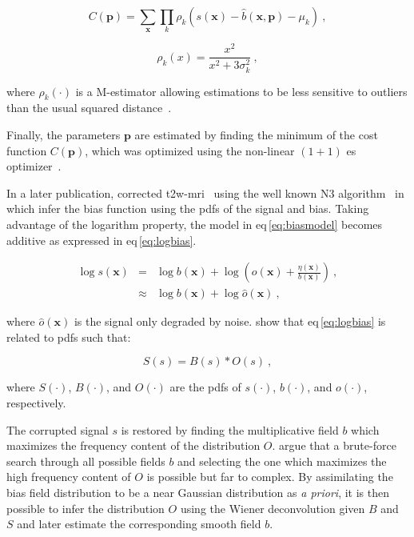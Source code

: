 \begin{equation}
	C(\mathbf{p}) = \sum_{\mathbf{x}} \prod_{k} \rho_k(s(\mathbf{x}) - \hat{b}(\mathbf{x},\mathbf{p}) - \mu_k) \ ,
	\label{eq:costbias}
\end{equation}

\begin{equation}
	\rho_k(x) = \frac{x^2}{x^2 + 3 \sigma_k^2} \ ,
	\label{eq:mestbias}
\end{equation}

\noindent where $\rho_k(\cdot)$ is a M-estimator allowing estimations to be less sensitive to outliers than the usual squared distance~\cite{Li1996}.

Finally, the parameters $\mathbf{p}$ are estimated by finding the minimum of the cost function $C(\mathbf{p})$, which was optimized using the non-linear $(1+1)$ \ac{es} optimizer~\cite{Styner1997}.

In a later publication, \citeauthor{Viswanath2012} corrected \ac{t2w}-\ac{mri}~\cite{Viswanath2012} using the well known N3 algorithm~\cite{Sled1998} in which \citeauthor{Sled1998} infer the bias function using the \acp{pdf} of the signal and bias.
Taking advantage of the logarithm property, the model in \acs{eq}\,\eqref{eq:biasmodel} becomes additive as expressed in \acs{eq}\,\eqref{eq:logbias}.

\begin{eqnarray}
	\log s(\mathbf{x}) & = & \log b(\mathbf{x}) + \log \left( o(\mathbf{x}) + \frac{\eta(\mathbf{x})}{b(\mathbf{x})} \right) \ , \nonumber \\
	& \approx & \log b(\mathbf{x}) + \log \hat{o}(\mathbf{x}) \ , \label{eq:logbias}
\end{eqnarray}

\noindent where $\hat{o}(\mathbf{x})$ is the signal only degraded by noise. \citeauthor{Sled1998} show that \acs{eq}\,\eqref{eq:logbias} is related to \acp{pdf} such that:

\begin{equation}
	S(s) = B(s) * O(s) \ ,
	\label{eq:distrbias} 
\end{equation}

\noindent where $S(\cdot)$, $B(\cdot)$, and $O(\cdot)$ are the \acp{pdf} of $s(\cdot)$, $b(\cdot)$, and $o(\cdot)$, respectively.

The corrupted signal $s$ is restored by finding the multiplicative field $b$ which maximizes the frequency content of the distribution $O$.
\citeauthor{Sled1998} argue that a brute-force search through all possible fields $b$ and selecting the one which maximizes the high frequency content of $O$ is possible but far to complex.
By assimilating the bias field distribution to be a near Gaussian distribution as \textit{a priori}, it is then possible to infer the distribution $O$ using the Wiener deconvolution given $B$ and $S$ and later estimate the corresponding smooth field $b$.

